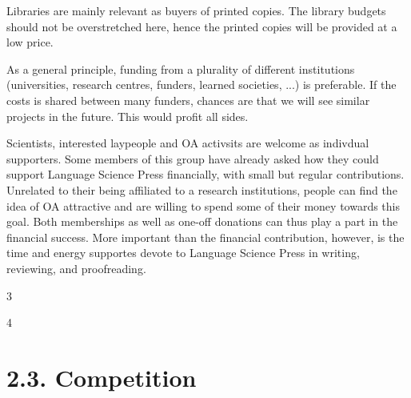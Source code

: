 \documentclass[output=guidelines,draftmode]{langscibook}
\newcommand{\evaluation}[1]{
  \renewcommand{\tblslinecolour}{lsLightOrange}
  \tblssy{receipt}{Evaluation}{#1}
}
\newcommand{\othersolutions}[1]{
  \renewcommand{\tblslinecolour}{lsDarkGreenOne}
  \tblssy{more}{Other solutions}{#1}
}
\renewcommand{\tblssy}[4][black!12]{%
  \renewcommand{\langscisymbol}{#2}\renewcommand{\tblsboxcolor}{#1}
  \begin{mdframed}[style=yellowexercise,frametitle={#3}]
    #4
  \end{mdframed}
}
\begin{document}
{Libraries are mainly relevant as buyers of printed copies. The library budgets should not be overstretched here, hence the printed copies will be provided at a low price. 

As a general principle, funding from a plurality of different institutions (universities, research centres, funders, learned societies, ...) is preferable. If the costs is shared between many funders, chances are that we will see similar projects in the future. This would profit all sides. %

Scientists, interested laypeople and OA activsits are welcome as indivdual supporters. Some members of this group have already asked how they could support Language Science Press financially, with small but regular contributions. Unrelated to their being affiliated to a research institutions, people can find the idea of OA attractive and are willing to spend some of their money towards this goal. Both memberships as well as one-off donations can thus play a part in the financial success. More important than the financial contribution, however, is the time and energy supportes devote to Language Science Press in writing, reviewing, and proofreading.
}
\evaluation{3}
\othersolutions{4}

 
\section{2.3. Competition }
\end{document}
